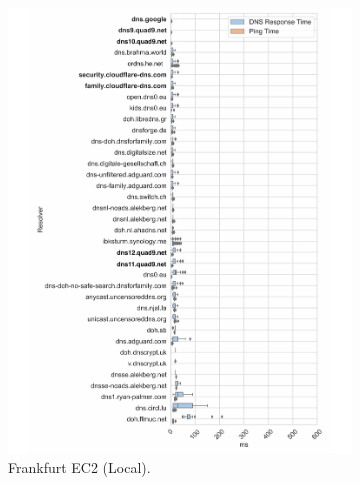 \begin{figure}[h!]
\begin{subfigure}[b]{0.4\textwidth}
\includegraphics[width=\textwidth]{figures/frankfurt_eur.pdf}
    \caption{Frankfurt EC2 (Local).}
\end{subfigure}
%
\begin{subfigure}[b]{0.4\textwidth}

\end{subfigure}
\end{figure}
